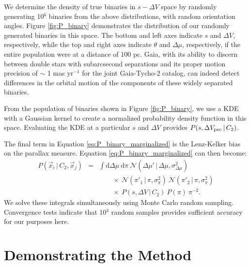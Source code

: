 \documentclass[usenatbib]{mnras}
\newcommand{\given}{\,|\,}
\newcommand{\dd}{\mathrm{d}}
\begin{document}
We determine the density of true binaries in $s-\Delta V$ space by randomly generating 10$^6$ binaries from the above distributions, with random orientation angles. Figure \ref{fig:P_binary} demonstrates the distribution of our randomly generated binaries in this space. The bottom and left axes indicate $s$ and $\Delta V$, respectively, while the top and right axes indicate $\theta$ and $\Delta \mu$, respectively, if the entire population were at a distance of 100 pc. Gaia, with its ability to discern between double stars with subarcsecond separations and its proper motion precision of $\sim$ 1 mas yr$^{-1}$ for the joint Gaia-Tycho-2 catalog, can indeed detect differences in the orbital motion of the components of these widely separated binaries.


From the population of binaries shown in Figure \ref{fig:P_binary}, we use a KDE with a Gaussian kernel to create a normalized probability density function in this space. Evaluating the KDE at a particular $s$ and $\Delta V$ provides $P(s, \Delta V_{\rm pec} \given C_2)$.



The final term in Equation \ref{eq:P_binary_marginalized} is the Lenz-Kelker bias on the parallax measure. Equation \ref{eq:P_binary_marginalized} can then become:
\begin{eqnarray}
P(\vec{x}_i \given C_2, \vec{x}_j) &=& \int \dd \Delta \mu\ \dd \pi\ 
\mathcal{N}( \Delta \mu' \given \Delta \mu, \sigma^2_{\Delta \mu} ) \nonumber \\
& & \qquad \times\ \mathcal{N}(\pi'_1 \given \pi, \sigma^2_{\pi})\ 
	\mathcal{N}(\pi'_2 \given \pi, \sigma^2_{\pi}) \nonumber \\
& & \qquad \times\ P(s, \Delta V \given C_2)\ P(\pi)\ \pi^{-2}.
\label{eq:P_binary}
\end{eqnarray}
We solve these integrals simultaneously using Monte Carlo random sampling. Convergence tests indicate that 10$^3$ random samples provides sufficient accuracy for our purposes here.




\section{Demonstrating the Method}
\end{document}
